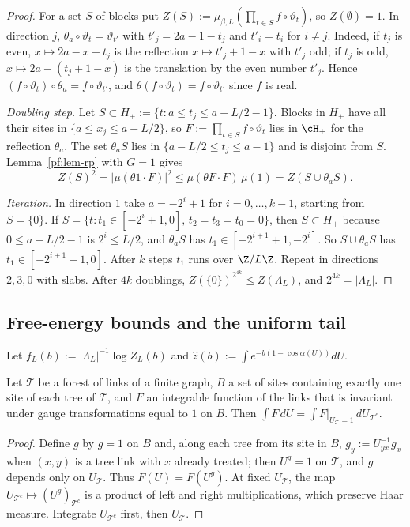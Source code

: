 \begin{proof}
For a set $S$ of blocks put $Z(S):=\mu_{\beta,L}(\prod_{t\in S}f\circ\vartheta_t)$, so $Z(\emptyset)=1$.
In direction $j$, $\theta_a\circ\vartheta_t=\vartheta_{t'}$ with $t'_j=2a-1-t_j$ and $t'_i=t_i$ for $i\ne j$. Indeed, if $t_j$ is even, $x\mapsto2a-x-t_j$ is the reflection $x\mapsto t'_j+1-x$ with $t'_j$ odd; if $t_j$ is odd, $x\mapsto2a-(t_j+1-x)$ is the translation by the even number $t'_j$. Hence $(f\circ\vartheta_t)\circ\theta_a=f\circ\vartheta_{t'}$, and $\theta(f\circ\vartheta_t)=f\circ\vartheta_{t'}$ since $f$ is real.

\emph{Doubling step.} Let $S\subset H_+:=\{t:a\le t_j\le a+L/2-1\}$. Blocks in $H_+$ have all their sites in $\{a\le x_j\le a+L/2\}$, so $F:=\prod_{t\in S}f\circ\vartheta_t$ lies in $\cH_+$ for the reflection $\theta_a$. The set $\theta_aS$ lies in $\{a-L/2\le t_j\le a-1\}$ and is disjoint from $S$. Lemma~\ref{pf:lem-rp} with $G=1$ gives
\[
Z(S)^2=|\mu(\theta1\cdot F)|^2\le\mu(\theta F\cdot F)\,\mu(1)=Z(S\cup\theta_aS).
\]

\emph{Iteration.} In direction $1$ take $a=-2^i+1$ for $i=0,\dots,k-1$, starting from $S=\{0\}$. If $S=\{t:t_1\in[-2^i+1,0],\,t_2=t_3=t_0=0\}$, then $S\subset H_+$ because $0\le a+L/2-1$ is $2^i\le L/2$, and $\theta_aS$ has $t_1\in[-2^{i+1}+1,-2^i]$. So $S\cup\theta_aS$ has $t_1\in[-2^{i+1}+1,0]$. After $k$ steps $t_1$ runs over $\Z/L\Z$. Repeat in directions $2,3,0$ with slabs. After $4k$ doublings, $Z(\{0\})^{2^{4k}}\le Z(\Lambda_L)$, and $2^{4k}=|\Lambda_L|$.
\end{proof}

\subsection{Free-energy bounds and the uniform tail}\label{pf:sec-free}

Let $f_L(b):=|\Lambda_L|^{-1}\log Z_L(b)$ and $\hat z(b):=\int e^{-b(1-\cos\alpha(U))}dU$.

\begin{lemma}\label{pf:lem-forest}
Let $\mathcal T$ be a forest of links of a finite graph, $B$ a set of sites containing exactly one site of each tree of $\mathcal T$, and $F$ an integrable function of the links that is invariant under gauge transformations equal to $1$ on $B$. Then $\int F\,dU=\int F|_{U_{\mathcal T}=1}\,dU_{\mathcal T^c}$.
\end{lemma}

\begin{proof}
Define $g$ by $g=1$ on $B$ and, along each tree from its site in $B$, $g_y:=U_{yx}^{-1}g_x$ when $(x,y)$ is a tree link with $x$ already treated; then $U^g=1$ on $\mathcal T$, and $g$ depends only on $U_{\mathcal T}$. Thus $F(U)=F(U^g)$. At fixed $U_{\mathcal T}$, the map $U_{\mathcal T^c}\mapsto(U^g)_{\mathcal T^c}$ is a product of left and right multiplications, which preserve Haar measure. Integrate $U_{\mathcal T^c}$ first, then $U_{\mathcal T}$.
\end{proof}

